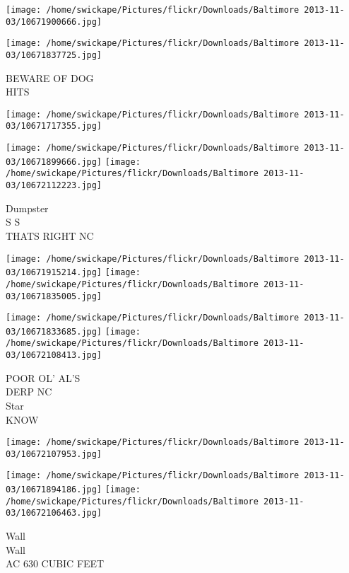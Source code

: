 \documentclass[10pt,letterpaper]{article}
\begin{document}
\texttt{[image: /home/swickape/Pictures/flickr/Downloads/Baltimore 2013-11-03/10671900666.jpg]}

\vspace{0.25in}
\texttt{[image: /home/swickape/Pictures/flickr/Downloads/Baltimore 2013-11-03/10671837725.jpg]}

BEWARE OF DOG\\
HITS\\
\pagebreak

\texttt{[image: /home/swickape/Pictures/flickr/Downloads/Baltimore 2013-11-03/10671717355.jpg]}

\vspace{0.25in}
\texttt{[image: /home/swickape/Pictures/flickr/Downloads/Baltimore 2013-11-03/10671899666.jpg]}
\texttt{[image: /home/swickape/Pictures/flickr/Downloads/Baltimore 2013-11-03/10672112223.jpg]}

Dumpster\\
S S\\
THATS RIGHT NC\\
\pagebreak

\texttt{[image: /home/swickape/Pictures/flickr/Downloads/Baltimore 2013-11-03/10671915214.jpg]}
\texttt{[image: /home/swickape/Pictures/flickr/Downloads/Baltimore 2013-11-03/10671835005.jpg]}

\texttt{[image: /home/swickape/Pictures/flickr/Downloads/Baltimore 2013-11-03/10671833685.jpg]}
\texttt{[image: /home/swickape/Pictures/flickr/Downloads/Baltimore 2013-11-03/10672108413.jpg]}

POOR OL' AL'S\\
DERP NC\\
Star\\
KNOW\\
\pagebreak

\texttt{[image: /home/swickape/Pictures/flickr/Downloads/Baltimore 2013-11-03/10672107953.jpg]}

\vspace{0.25in}
\texttt{[image: /home/swickape/Pictures/flickr/Downloads/Baltimore 2013-11-03/10671894186.jpg]}
\texttt{[image: /home/swickape/Pictures/flickr/Downloads/Baltimore 2013-11-03/10672106463.jpg]}

Wall\\
Wall\\
AC 630 CUBIC FEET\\
\pagebreak
\end{document}

